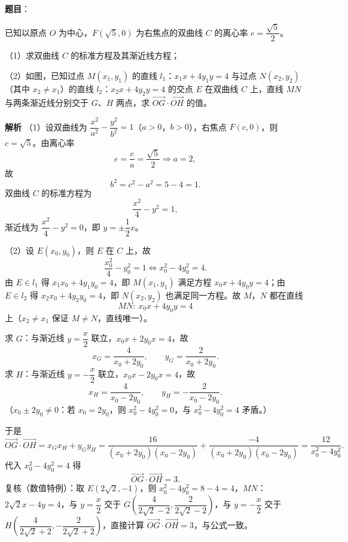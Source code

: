 \begin{answer}

\textbf{题目}：

已知以原点 $O$ 为中心，$F(\sqrt5,0)$ 为右焦点的双曲线 $C$ 的离心率 $e=\dfrac{\sqrt5}{2}$。

（1）求双曲线 $C$ 的标准方程及其渐近线方程；

（2）如图，已知过点 $M(x_1,y_1)$ 的直线 $l_1$：$x_1x+4y_1y=4$ 与过点 $N(x_2,y_2)$（其中 $x_2\neq x_1$）的直线 $l_2$：$x_2x+4y_2y=4$ 的交点 $E$ 在双曲线 $C$ 上，直线 $MN$ 与两条渐近线分别交于 $G$、$H$ 两点，求 $\overrightarrow{OG}\cdot\overrightarrow{OH}$ 的值。
\nopagebreak[4]
\begin{center}\end{center}
\nopagebreak[4]
\textbf{解析}
（1）设双曲线为 $\dfrac{x^2}{a^2}-\dfrac{y^2}{b^2}=1$（$a>0$，$b>0$），右焦点 $F(c,0)$，则 $c=\sqrt5$。由离心率
\nopagebreak[4]
\[e=\frac ca=\frac{\sqrt5}{2}\Longrightarrow a=2,\]
故
\nopagebreak[4]
\[b^2=c^2-a^2=5-4=1.\]
双曲线 $C$ 的标准方程为
\nopagebreak[4]
\[\frac{x^2}{4}-y^2=1,\]
渐近线为 $\dfrac{x^2}{4}-y^2=0$，即 $y=\pm\dfrac12x$。

（2）设 $E(x_0,y_0)$，则 $E$ 在 $C$ 上，故
\nopagebreak[4]
\[\frac{x_0^2}{4}-y_0^2=1\iff x_0^2-4y_0^2=4.\]
由 $E\in l_1$ 得 $x_1x_0+4y_1y_0=4$，即 $M(x_1,y_1)$ 满足方程 $x_0x+4y_0y=4$；由 $E\in l_2$ 得 $x_2x_0+4y_2y_0=4$，即 $N(x_2,y_2)$ 也满足同一方程。故 $M$，$N$ 都在直线
\nopagebreak[4]
\[MN:\ x_0x+4y_0y=4\]
上（$x_2\neq x_1$ 保证 $M\neq N$，直线唯一）。

求 $G$：与渐近线 $y=\dfrac x2$ 联立，$x_0x+2y_0x=4$，故
\nopagebreak[4]
\[x_G=\frac{4}{x_0+2y_0},\qquad y_G=\frac{2}{x_0+2y_0}.\]
求 $H$：与渐近线 $y=-\dfrac x2$ 联立，$x_0x-2y_0x=4$，故
\nopagebreak[4]
\[x_H=\frac{4}{x_0-2y_0},\qquad y_H=-\frac{2}{x_0-2y_0}.\]
（$x_0\pm2y_0\neq0$：若 $x_0=2y_0$，则 $x_0^2-4y_0^2=0$，与 $x_0^2-4y_0^2=4$ 矛盾。）

于是
\nopagebreak[4]
\[\overrightarrow{OG}\cdot\overrightarrow{OH}=x_Gx_H+y_Gy_H=\frac{16}{\left(x_0+2y_0\right)\left(x_0-2y_0\right)}+\frac{-4}{\left(x_0+2y_0\right)\left(x_0-2y_0\right)}=\frac{12}{x_0^2-4y_0^2}.\]
代入 $x_0^2-4y_0^2=4$ 得
\nopagebreak[4]
\[\overrightarrow{OG}\cdot\overrightarrow{OH}=3.\]
复核（数值特例）：取 $E\left(2\sqrt2,-1\right)$，则 $x_0^2-4y_0^2=8-4=4$，$MN$：$2\sqrt2x-4y=4$，与 $y=\dfrac x2$ 交于 $G\left(\dfrac{4}{2\sqrt2-2},\dfrac{2}{2\sqrt2-2}\right)$，与 $y=-\dfrac x2$ 交于 $H\left(\dfrac{4}{2\sqrt2+2},-\dfrac{2}{2\sqrt2+2}\right)$，直接计算 $\overrightarrow{OG}\cdot\overrightarrow{OH}=3$，与公式一致。


\end{answer}